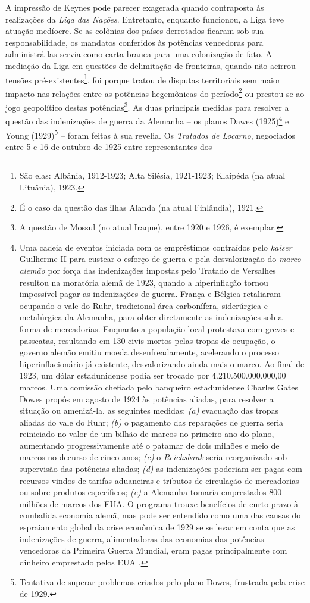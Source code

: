 A impressão de Keynes pode parecer exagerada quando contraposta às realizações da \textit{Liga das Nações}. Entretanto, enquanto funcionou, a Liga teve atuação medíocre. Se as colônias dos países derrotados ficaram sob sua responsabilidade, os mandatos conferidos às potências vencedoras para administrá-las servia como carta branca para uma colonização de fato. A mediação da Liga em questões de delimitação de fronteiras, quando não acirrou tensões pré-existentes\footnote{São elas: Albânia, 1912-1923; Alta Silésia, 1921-1923; Klaipéda (na atual Lituânia), 1923.}, foi porque tratou de disputas territoriais sem maior impacto nas relações entre as potências hegemônicas do período\footnote{É o caso da questão das ilhas Alanda (na atual Finlândia), 1921.} ou prestou-se ao jogo geopolítico destas potências\footnote{A questão de Mossul (no atual Iraque), entre 1920 e 1926, é exemplar.}. As duas principais medidas para resolver a questão das indenizações de guerra da Alemanha -- os planos Dawes (1925)\footnote{Uma cadeia de eventos iniciada com os empréstimos contraídos pelo \textit{kaiser} Guilherme II para custear o esforço de guerra e pela desvalorização do \textit{marco alemão} por força das indenizações impostas pelo Tratado de Versalhes resultou na moratória alemã de 1923, quando a hiperinflação tornou impossível pagar as indenizações de guerra. França e Bélgica retaliaram ocupando o vale do Ruhr, tradicional área carbonífera, siderúrgica e metalúrgica da Alemanha, para obter diretamente as indenizações sob a forma de mercadorias. Enquanto a população local protestava com greves e passeatas, resultando em 130 civis mortos pelas tropas de ocupação, o governo alemão emitiu moeda desenfreadamente, acelerando o processo hiperinflacionário já existente, desvalorizando ainda mais o marco. Ao final de 1923, um dólar estadunidense podia ser trocado por 4.210.500.000.000,00 marcos. Uma comissão chefiada pelo banqueiro estadunidense Charles Gates Dowes propôs em agosto de 1924 às potências aliadas, para resolver a situação ou amenizá-la, as seguintes medidas: \textit{(a)} evacuação das tropas aliadas do vale do Ruhr; \textit{(b)} o pagamento das reparações de guerra seria reiniciado no valor de um bilhão de marcos no primeiro ano do plano, aumentando progressivamente até o patamar de dois milhões e meio de marcos no decurso de cinco anos; \textit{(c)} o \textit{Reichsbank} seria reorganizado sob supervisão das potências aliadas; \textit{(d)} as indenizações poderiam ser pagas com recursos vindos de tarifas aduaneiras e tributos de circulação de mercadorias ou sobre produtos específicos; \textit{(e)} a Alemanha tomaria emprestados 800 milhões de marcos dos EUA. O programa trouxe benefícios de curto prazo à combalida economia alemã, mas pode ser entendido como uma das causas do espraiamento global da crise econômica de 1929 se se levar em conta que as indenizações de guerra, alimentadoras das economias das potências vencedoras da Primeira Guerra Mundial, eram pagas principalmente com dinheiro emprestado pelos EUA \cite[p.~85]{carr_relations_1937}.} e Young (1929)\footnote{Tentativa de superar problemas criados pelo plano Dowes, frustrada pela crise de 1929.} -- foram feitas à sua revelia. Os \textit{Tratados de Locarno}, negociados entre 5 e 16 de outubro de 1925 entre representantes dos 